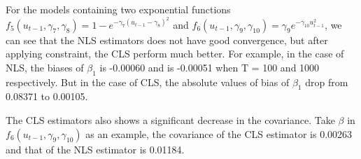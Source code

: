 \documentclass[a4paper,12pt,times,numbered,print,index]{report}
\numberwithin{equation}{section}
\begin{document}
For the models containing two exponential functions $f_{5}\left( u_{t-1}, \gamma_{7}, \gamma_{8}\right) = 1-e^{-\gamma_{7}\left(u_{t-1}-\gamma_{8}\right)^{2}}$ and $f_{6}\left( u_{t-1},\gamma _{9}, \gamma_{10}\right) = \gamma_{9} e^{-\gamma_{10}u_{t-1}^2}$, we can see that the NLS estimators does not have good convergence, but after applying constraint, the CLS perform much better. For example, in the case of NLS, the biases of $\beta_{1}$ is -0.00060 and is -0.00051 when T = 100 and 1000 respectively. But in the case of CLS, the absolute values of bias of $\beta_{1}$ drop from 0.08371 to 0.00105. 

The CLS estimators also shows a significant decrease in the covariance. Take $\beta$ in $f_{6}\left( u_{t-1},\gamma _{9}, \gamma_{10}\right)$ as an example, the covariance of the CLS estimator is 0.00263 and that of the NLS estimator is 0.01184.
 
\end{document}
